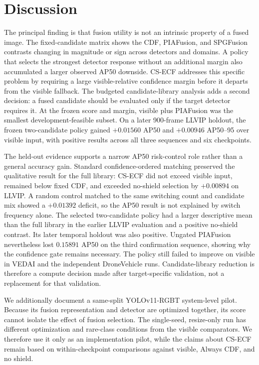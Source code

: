 \section{Discussion}

The principal finding is that fusion utility is not an intrinsic property of a
fused image. The fixed-candidate matrix shows the CDF, PIAFusion, and SPGFusion
contrasts changing in magnitude or sign across detectors and domains. A policy
that selects the strongest detector response without an additional margin also
accumulated a larger observed AP50 downside. CS-ECF addresses this specific
problem by requiring a large visible-relative confidence margin before it
departs from the visible fallback. The budgeted candidate-library analysis adds
a second decision: a fused candidate should be evaluated only if the target
detector requires it. At the frozen score and margin, visible plus PIAFusion
was the smallest development-feasible subset. On a later 900-frame LLVIP
holdout, the frozen two-candidate policy gained \(+0.01560\) AP50 and
\(+0.00946\) AP50--95 over visible input, with positive results across all
three sequences and six checkpoints.

The held-out evidence supports a narrow AP50 risk-control role rather than a
general accuracy gain. Standard confidence-ordered matching preserved the
qualitative result for the full library: CS-ECF did not exceed visible input,
remained below fixed CDF, and exceeded no-shield selection by \(+0.00894\) on
LLVIP. A random control matched to the same switching count and candidate mix
showed a \(+0.01392\) deficit, so the AP50 result is not explained by switch
frequency alone. The selected two-candidate policy had a larger descriptive
mean than the full library in the earlier LLVIP evaluation and a positive
no-shield contrast. Its later temporal holdout was also positive. Ungated
PIAFusion nevertheless lost \(0.15891\) AP50 on the third confirmation
sequence, showing why the confidence gate remains necessary. The policy still
failed to improve on visible in VEDAI and the independent DroneVehicle runs.
Candidate-library reduction is therefore a compute decision made after
target-specific validation, not a replacement for that validation.

We additionally document a same-split YOLOv11-RGBT system-level pilot. Because
its fusion representation and detector are optimized together,
its score cannot isolate the effect of fusion selection. The single-seed,
resize-only run has different optimization and rare-class conditions from the
visible comparators. We therefore use it only as an implementation pilot,
while the claims about CS-ECF remain based on within-checkpoint comparisons
against visible, Always CDF, and no shield.

